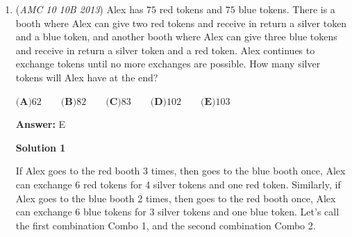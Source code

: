 \begin{enumerate}
\textbf{Solution 5}

We know that $[AEDC]=\frac{3}{4}[ABC]$, and $[ABC]=3[PAC]$ using median properties. So Now we try to find $[PAC]$. Since $\triangle PAC\sim \triangle PDE$, then the side lengths of $\triangle PAC$ are twice as long as $\triangle PDE$ since $D$ and $E$ are midpoints. Therefore, $\frac{[PAC]}{[PDE]}=2^2=4$. It suffices to compute $[PDE]$. Notice that $(1.5, 2, 2.5)$ is a Pythagorean Triple, so $[PDE]=\frac{1.5\times 2}{2}=1.5$. This implies $[PAC]=1.5\cdot 4=6$, and then $[ABC]=3\cdot 6=18$. Finally, $[AEDC]=\frac{3}{4}\times 18=\boxed{13.5}$.

 



\textbf{Solution 6}

As from Solution 4, we find the area of $\triangle DPE$ to be $\frac{3}{2}$. Because $DE = \frac{5}{2}$, the altitude perpendicular to $DE = \frac{6}{5}$. Also, because $DE || AC$, $\triangle ABC$ is similar to $\triangle{DBE}$ with side length ratio $2:1$, so $AC=5$ and the altitude perpendicular to $AC = \frac{12}{5}$. The altitude of trapezoid $ACDE$ is then $\frac{18}{5}$ and the bases are $\frac{5}{2}$ and $5$. So, we use the formula for the area of a trapezoid to find the area of $ACDE = \boxed{13.5}$



	\item (\textit{AMC 10 10B 2013}) Alex has $75$ red tokens and $75$ blue tokens. There is a booth where Alex can give two red tokens and receive in return a silver token and a blue token, and another booth where Alex can give three blue tokens and receive in return a silver token and a red token. Alex continues to exchange tokens until no more exchanges are possible. How many silver tokens will Alex have at the end?


 $\textbf{(A)} 62 \qquad \textbf{(B)} 82 \qquad \textbf{(C)} 83 \qquad \textbf{(D)} 102 \qquad \textbf{(E)} 103$

 \textbf{Answer: }E



\textbf{Solution 1}

If Alex goes to the red booth 3 times, then goes to the blue booth once, Alex can exchange 6 red tokens for 4 silver tokens and one red token. Similarly, if Alex goes to the blue booth 2 times, then goes to the red booth once, Alex can exchange 6 blue tokens for 3 silver tokens and one blue token. Let's call the first combination Combo 1, and the second combination Combo 2.


\end{enumerate}
